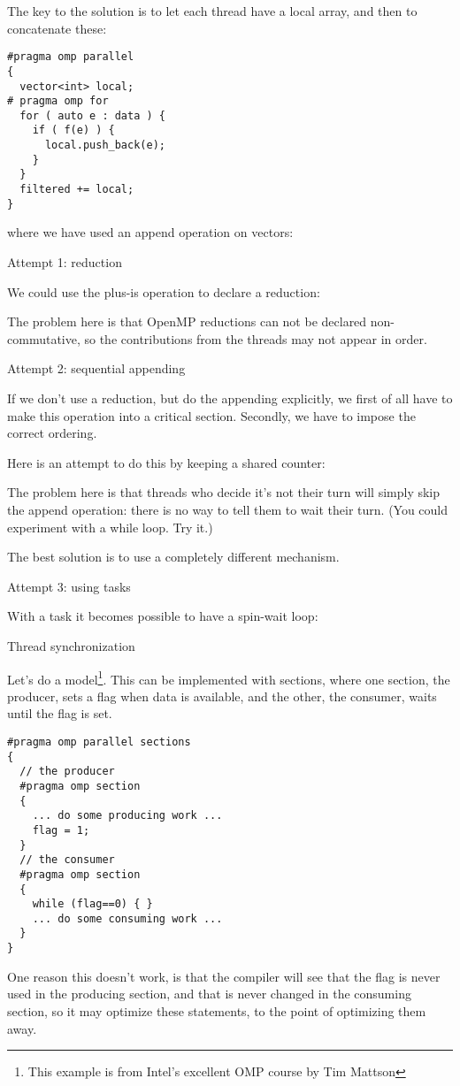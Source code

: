 The key to the solution is to let each thread have a local array,
and then to concatenate these:
\begin{lstlisting}
#pragma omp parallel 
{
  vector<int> local;
# pragma omp for
  for ( auto e : data ) {
    if ( f(e) ) {
      local.push_back(e);
    }
  }
  filtered += local;
}
\end{lstlisting}
where we have used an append operation on vectors:

 {Attempt 1: reduction}

We could use the plus-is operation to declare a reduction:

The problem here is that OpenMP reductions can not be declared
non-commutative, so the contributions from the threads
may not appear in order.


 {Attempt 2: sequential appending}

If we don't use a reduction, but do the appending explicitly,
we first of all have to make this operation into a critical section.
Secondly, we have to impose the correct ordering.

Here is an attempt to do this by keeping a shared counter:

The problem here is that threads who decide it's not their turn
will simply skip the append operation: there is no way to
tell them to wait their turn.
(You could experiment with a while loop. Try it.)

The best solution is to use a completely different mechanism.

 {Attempt 3: using tasks}

With a task it becomes possible to have a spin-wait loop:


\lstset{language=C}

 {Thread synchronization}

Let's do a  model\footnote{This example
  is from Intel's excellent OMP course by Tim Mattson}.  This can be
implemented with sections, where one section, the producer, sets a
flag when data is available, and the other, the consumer, waits until
the flag is set.
\begin{lstlisting}
#pragma omp parallel sections
{
  // the producer
  #pragma omp section
  {
    ... do some producing work ...
    flag = 1;
  }
  // the consumer
  #pragma omp section
  {
    while (flag==0) { }
    ... do some consuming work ...
  }
}
\end{lstlisting}
One reason this doesn't work, is that the compiler will see that the flag is never used
in the producing section, and that is never changed in the consuming section, so
it may optimize these statements, to the point of optimizing them away.

